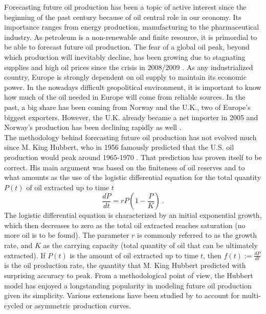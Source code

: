 \documentclass[review]{elsarticle}
\begin{document}
\lettrine[nindent=0em,lines=3] Forecasting future oil production
has been a topic of active interest since the beginning of the past
century because of oil central role in our economy. Its importance
ranges from energy production, manufacturing to the pharmaceutical
industry. As petroleum is a non-renewable and finite resource, it
is primordial to be able to forecast future oil production. The fear
of a global oil peak, beyond which production will inevitably decline,
has been growing due to stagnating supplies and high oil prices since
the crisis in 2008/2009 \citep{Murray2013}. As any industrialized
country, Europe is strongly dependent on oil supply to maintain its
economic power. In the nowadays difficult geopolitical environment,
it is important to know how much of the oil needed in Europe will
come from reliable sources. In the past, a big share has been coming
from Norway and the U.K., two of Europe's biggest exporters. However,
the U.K. already became a net importer in 2005 and Norway\textquoteright{}s
production has been declining rapidly as well \citep{Hook2008}.\\
 The methodology behind forecasting future oil production has not
evolved much since M. King Hubbert, who in 1956 famously predicted
that the U.S. oil production would peak around 1965-1970 \citep{Hubbert1956}.
That prediction has proven itself to be correct. His main argument
was based on the finiteness of oil reserves and to what amounts
as the use of the logistic differential equation for the total
quantity $P(t)$ of oil extracted up to time $t$
\begin{equation}
\frac{dP}{dt}=rP\left(1-\frac{P}{K}\right)~.
\label{logistic}
\end{equation}
The logistic differential equation
is characterized by an initial exponential growth, which then decreases
to zero as the total oil extracted reaches saturation (no more oil
is to be found). The parameter $r$ is commonly referred to as the
growth rate, and $K$ as the carrying capacity (total quantity of
oil that can be ultimately extracted). If $P(t)$ is the amount of oil extracted up to
time $t$, then $f(t) := \frac{dP}{dt}$ is the oil production rate, the quantity
that M. King Hubbert predicted with surprising accuracy to peak. From
a methodological point of view, the Hubbert model has enjoyed a longstanding
popularity in modeling future oil production given its simplicity.
Various extensions have been studied by \citet{Brandt2007}
to account for multi-cycled or asymmetric production curves.
\end{document}
